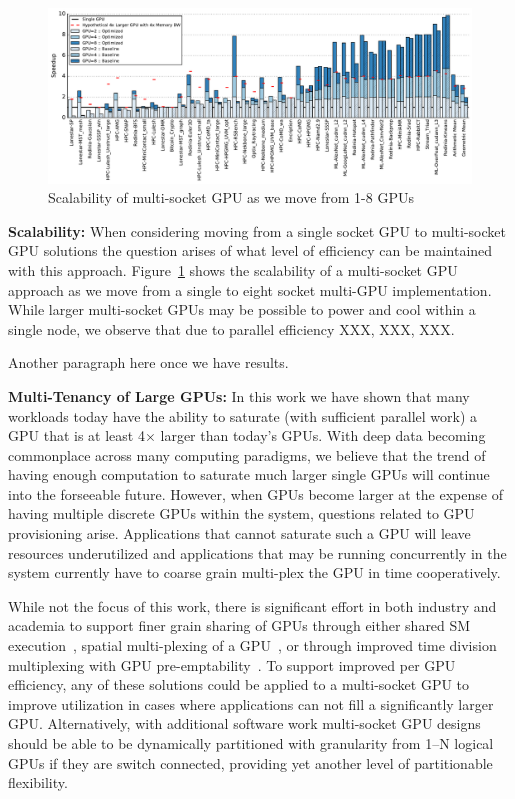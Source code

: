 \begin{figure}[t]
    \centering
    \includegraphics[width=1.0\textwidth]{figures/plot_scalability_mgpu_WB.pdf}
    \caption{Scalability of multi-socket GPU as we move from 1-8 GPUs}
    \label{fig:scalability}
\end{figure}

\textbf{Scalability:} When considering moving from a single socket GPU to
multi-socket GPU solutions the question arises of what level of efficiency
can be maintained with this approach.  Figure~\ref{fig:scalability} shows the
scalability of a multi-socket GPU approach as we move from a single to 
eight socket multi-GPU implementation.  While larger multi-socket GPUs
may be possible to power and cool within a single node, we observe that due
to parallel efficiency XXX, XXX, XXX.

Another paragraph here once we have results.\vspace{1in}

\textbf{Multi-Tenancy of Large GPUs:} In this work we have shown that many 
workloads today have the ability to
saturate (with sufficient parallel work) a GPU that is at least 4$\times$
larger than today's GPUs.  With deep data becoming commonplace across many
computing paradigms, we believe that the trend of having enough computation
to saturate much larger single GPUs will continue into the forseeable future.
However, when GPUs become larger at the expense of having multiple discrete
GPUs within the system, questions related to GPU provisioning arise.  Applications
that cannot saturate such a GPU will leave resources underutilized and applications
that may be running concurrently in the system currently have to coarse grain
multi-plex the GPU in time cooperatively.  

While not the focus of this work,
there is significant effort in both industry and academia to support finer
grain sharing of GPUs through either shared SM execution~\cite{XXX}, spatial
multi-plexing of a GPU~\cite{XXX}, or through improved time division multiplexing
with GPU pre-emptability~\cite{XXX}.  To support improved per GPU efficiency,
any of these solutions could be applied to a multi-socket GPU to improve utilization
in cases where applications can not fill a significantly larger GPU.  Alternatively,
with additional software work multi-socket GPU designs should be able to be dynamically
partitioned with granularity from 1--N logical GPUs if they are switch connected, providing
yet another level of partitionable flexibility.

